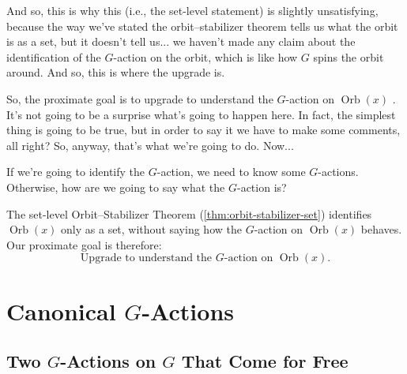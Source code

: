 \begin{speech}[00:07:16 - 00:08:32]
And so, this is why this (i.e., the set-level statement) is slightly unsatisfying, because the way we've stated the orbit--stabilizer theorem tells us what the orbit is as a set, but it doesn't tell us... we haven't made any claim about the identification of the $G$-action on the orbit, which is like how $G$ spins the orbit around. And so, this is where the upgrade is.

So, the proximate goal is to upgrade to understand the $G$-action on $\operatorname{Orb}(x)$ . It's not going to be a surprise what's going to happen here. In fact, the simplest thing is going to be true, but in order to say it we have to make some comments, all right? So, anyway, that's what we're going to do. Now...

If we're going to identify the $G$-action, we need to know some $G$-actions. Otherwise, how are we going to say what the $G$-action is? 
\end{speech}

\begin{content}
The set-level Orbit--Stabilizer Theorem (\cref{thm:orbit-stabilizer-set}) identifies $\operatorname{Orb}(x)$ only as a set, without saying how the $G$-action on $\operatorname{Orb}(x)$ behaves. Our proximate goal is therefore:
\[
\text{Upgrade to understand the } G\text{-action on } \operatorname{Orb}(x).
\]
\end{content}

\section{Canonical \texorpdfstring{$G$}{G}-Actions}

\subsection{Two \texorpdfstring{$G$}{G}-Actions on \texorpdfstring{$G$}{G} That Come for Free}

